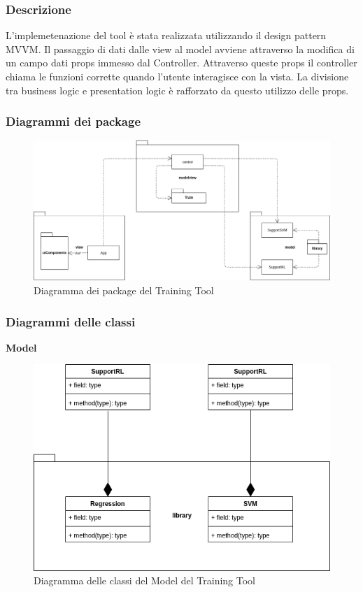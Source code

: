 \subsubsection{Descrizione}
L'implemetenazione del tool è stata realizzata utilizzando il design pattern MVVM.
Il passaggio di dati dalle view al model avviene attraverso la modifica di un campo dati props immesso dal Controller.
Attraverso queste props il controller chiama le funzioni corrette quando l’utente interagisce con la vista.
La divisione tra business logic e presentation logic è rafforzato da questo utilizzo delle props.



\subsubsection{Diagrammi dei package}
\begin{figure}[H]
\centering
\includegraphics[scale=0.45]{../../Diagrams/Package_diagrams/tool_design_patern.png}
\caption{Diagramma dei package del Training Tool}
\end{figure}

\subsubsection{Diagrammi delle classi}
\textbf{Model}
\begin{figure}[H]
\centering
\includegraphics[scale=0.5]{../../Diagrams/Classes_diagrams/tool_model.png}
\caption{Diagramma delle classi del Model del Training Tool}
\end{figure}

